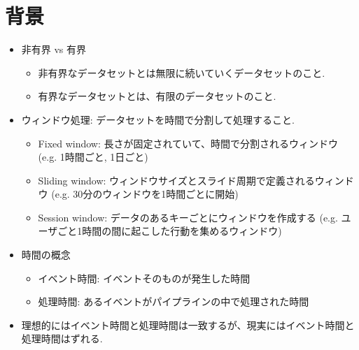 \documentclass[dvipdfmx,uplatex]{jsarticle}
\theoremstyle{remark}
\newenvironment{simplebox}{
    \begin{tcolorbox}[
        fonttitle=\bfseries,
    ]
}{
    \end{tcolorbox}
}
\begin{document}
\section{背景}
\begin{simplebox}
\begin{itemize}
    \item 非有界 vs 有界
    \begin{itemize}
        \item 非有界なデータセットとは無限に続いていくデータセットのこと.
        \item 有界なデータセットとは、有限のデータセットのこと.
    \end{itemize}
    \item ウィンドウ処理: データセットを時間で分割して処理すること.
    \begin{itemize}
        \item Fixed window: 長さが固定されていて、時間で分割されるウィンドウ (e.g. 1時間ごと, 1日ごと)
        \item Sliding window: ウィンドウサイズとスライド周期で定義されるウィンドウ (e.g. 30分のウィンドウを1時間ごとに開始)
        \item Session window: データのあるキーごとにウィンドウを作成する (e.g. ユーザごと1時間の間に起こした行動を集めるウィンドウ)
    \end{itemize}
    \item 時間の概念
    \begin{itemize}
        \item イベント時間: イベントそのものが発生した時間
        \item 処理時間: あるイベントがパイプラインの中で処理された時間
    \end{itemize}
    \item 理想的にはイベント時間と処理時間は一致するが、現実にはイベント時間と処理時間はずれる.
\end{itemize}
\end{simplebox}
\end{document}
